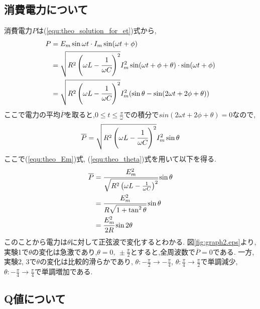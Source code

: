 \subsection{消費電力について}
消費電力$P$は(\ref{equ:theo_solution_for_et})式から,
\begin{align*}
  \begin{split}
    P&=E_m\sin\omega t\cdot I_m\sin(\omega t+\phi)\\
    &=\sqrt{R^2\left(\omega L-\cfrac{1}{\omega C}\right)^2}I_m^2\sin(\omega t+\phi+\theta)\cdot\sin(\omega t+\phi)\\
    &=\sqrt{R^2\left(\omega L-\cfrac{1}{\omega C}\right)^2}I_m^2(\sin\theta-\sin(2\omega t+2\phi+\theta))
  \end{split}
\end{align*}
ここで電力の平均$\overline{P}$を取ると,$0\leq t\leq \frac{\pi}{\omega}$での積分で$sin(2\omega t+2\phi+\theta)=0$なので,
\begin{align*}
  \overline{P}=\sqrt{R^2\left(\omega L-\cfrac{1}{\omega C}\right)^2}I_m^2\sin\theta
\end{align*}
ここで(\ref{equ:theo_Em})式, (\ref{equ:theo_theta})式を用いて以下を得る.
\begin{align*}
  \overline{P}&=\cfrac{E_m^2}{\sqrt{R^2\left(\omega L-\frac{1}{\omega C}\right)^2}}\sin\theta\\
  &=\cfrac{E_m^2}{R\sqrt{1+\tan^2\theta}}\sin\theta\\
  &=\cfrac{E_m^2}{2R}\sin 2\theta
\end{align*}
このことから電力は$θ$に対して正弦波で変化するとわかる.
図\ref{fig:graph2.eps}より,実験1で$\theta$の変化は急激であり,$\theta=0,\ \pm\frac{\pi}{2}$とすると,全周波数で$\overline{P}=0$である.
一方,実験2, 3で$\theta$の変化は比較的滑らかであり, $\theta:-\frac{\pi}{2}\rightarrow-\frac{\pi}{4}$, $\theta:\frac{\pi}{4}\rightarrow\frac{\pi}{2}$で単調減少, $\theta:-\frac{\pi}{4}\rightarrow\frac{\pi}{4}$で単調増加である.
\subsection{Q値について}
